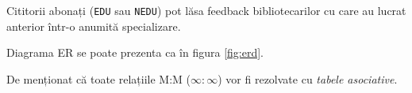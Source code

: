 Cititorii abonați (\texttt{EDU} sau \texttt{NEDU}) pot lăsa feedback
bibliotecarilor cu care au lucrat anterior într-o anumită specializare.

Diagrama ER se poate prezenta ca în figura \ref{fig:erd}.

De menționat că toate relațiile M:M ($\infty : \infty$) vor fi rezolvate
cu \emph{tabele asociative}.



\newpage

